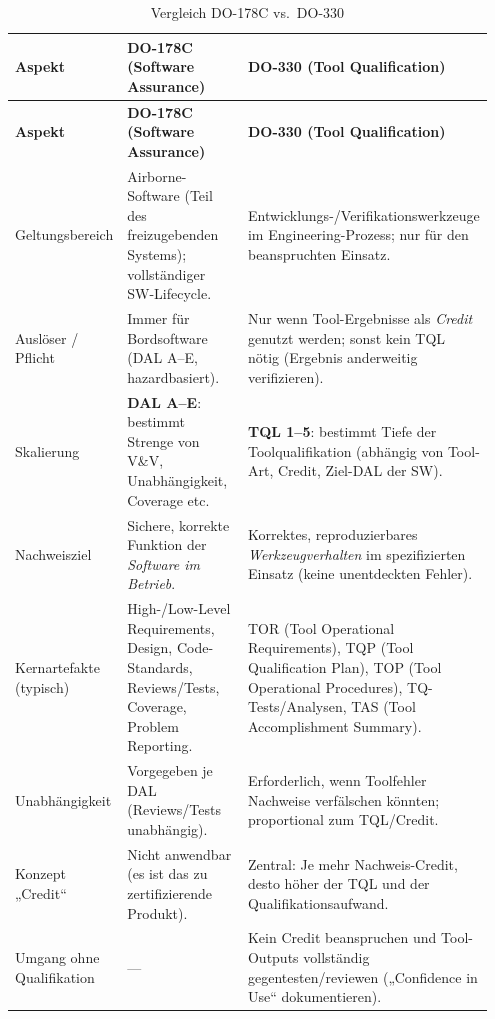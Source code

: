 \begin{longtable}{p{0.21\linewidth}p{0.36\linewidth}p{0.38\linewidth}}
\caption{Vergleich DO-178C vs.\ DO-330 }\label{tab:do178c-do330}\\
\toprule
\textbf{Aspekt} & \textbf{DO-178C (Software Assurance)} & \textbf{DO-330 (Tool Qualification)} \\
\midrule
\endfirsthead
\toprule
\textbf{Aspekt} & \textbf{DO-178C (Software Assurance)} & \textbf{DO-330 (Tool Qualification)} \\
\midrule
\endhead
\bottomrule
\endlastfoot

Geltungsbereich &
Airborne-Software (Teil des freizugebenden Systems); vollständiger SW-Lifecycle. &
Entwicklungs-/Verifikationswerkzeuge im Engineering-Prozess; nur für den beanspruchten Einsatz. \\[4pt]

Auslöser / Pflicht &
Immer für Bordsoftware (DAL A–E, hazardbasiert). &
Nur wenn Tool-Ergebnisse als \emph{Credit} genutzt werden; sonst kein TQL nötig (Ergebnis anderweitig verifizieren). \\[4pt]

Skalierung &
\textbf{DAL A–E}: bestimmt Strenge von V\&V, Unabhängigkeit, Coverage etc. &
\textbf{TQL 1–5}: bestimmt Tiefe der Toolqualifikation (abhängig von Tool-Art, Credit, Ziel-DAL der SW). \\[4pt]

Nachweisziel &
Sichere, korrekte Funktion der \emph{Software im Betrieb}. &
Korrektes, reproduzierbares \emph{Werkzeugverhalten} im spezifizierten Einsatz (keine unentdeckten Fehler). \\[4pt]

Kernartefakte (typisch) &
High-/Low-Level Requirements, Design, Code-Standards, Reviews/Tests, Coverage, Problem Reporting. &
TOR (Tool Operational Requirements), TQP (Tool Qualification Plan), TOP (Tool Operational Procedures),
TQ-Tests/Analysen, TAS (Tool Accomplishment Summary). \\[4pt]

Unabhängigkeit &
Vorgegeben je DAL (Reviews/Tests unabhängig). &
Erforderlich, wenn Toolfehler Nachweise verfälschen könnten; proportional zum TQL/Credit. \\[4pt]

Konzept „Credit“ &
Nicht anwendbar (es ist das zu zertifizierende Produkt). &
Zentral: Je mehr Nachweis-Credit, desto höher der TQL und der Qualifikationsaufwand. \\[4pt]

Umgang ohne Qualifikation &
— &
Kein Credit beanspruchen und Tool-Outputs vollständig gegentesten/reviewen („Confidence in Use“ dokumentieren). \\[4pt]

\end{longtable}

